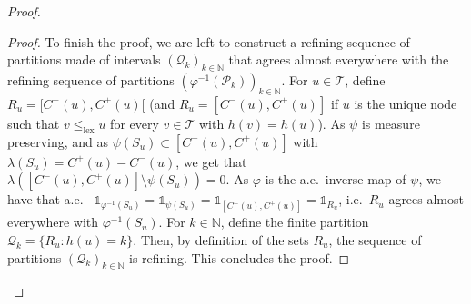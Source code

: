 \documentclass{amsart}
\newcommand{\aE}{a.e.\ }
\newcommand{\ie}{i.e.\ }
\theoremstyle{plain}
\theoremstyle{definition}
\newcommand{\cP}{\mathcal{P}}
\newcommand{\cQ}{\mathcal{Q}}
\newcommand{\cT}{\mathcal{T}}
\newcommand{\ind}{\mathds{1}}
\newcommand{\N}{\mathbb{N}}
\newcommand{\leqlex}{\leq_{\mathrm{lex}}}
\begin{document}
\begin{proof}
\begin{proof}
To finish the proof, we are left to construct a refining sequence of
 partitions made of intervals $(\cQ_k )_{k\in\N}$ that agrees
almost everywhere with the refining sequence of partitions $(\varphi^{-1}(\cP_k))_{k\in\N}$.
For $u\in\cT$, 
define $R_u = [C^-(u), C^+(u)[$
	(and $R_u = [C^-(u), C^+(u)]$ if $u$ is the unique node
		such that $v\leqlex u$ for every $v\in\cT$ with $h(v)=h(u)$).
As $\psi$ is measure preserving, and as $\psi(S_u) \subset [C^-(u), C^+(u)]$
	with $\lambda(S_u) = C^+(u) - C^-(u)$, 
	we get that $\lambda([C^-(u), C^+(u)] \setminus \psi(S_u)) =0$.
As $\varphi$ is the \aE inverse map of $\psi$, we have that \aE
	$\ind_{\varphi^{-1}(S_u)} = \ind_{\psi(S_u)} = \ind_{[C^-(u), C^+(u)]} = \ind_{R_u}$,
\ie  $R_u$ agrees almost everywhere 
with  $\varphi^{-1}(S_u)$.
For $k\in\N$, define the finite partition $\cQ_k = \{ R_u : h(u)=k \}$.
Then, by definition of the sets $R_u$,
	the sequence of partitions $(\cQ_k)_{k\in\N}$ is refining.
This concludes the proof.
\end{proof}



\end{proof}
\end{document}

